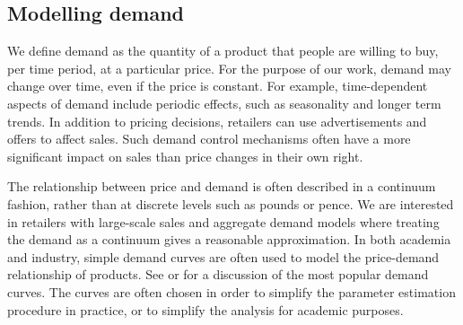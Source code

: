 \documentclass[main.tex]{subfiles}
\begin{document}
\subsection{Modelling demand}\label{sec:intro_model_demand}
We define demand as the quantity of a product that people are willing
to buy, per time period, at a particular price. For the purpose of our
work, demand may change over time, even if the price is constant.
For example, time-dependent aspects of demand include periodic effects, such as
seasonality and longer term trends.
In addition to pricing decisions, retailers can use advertisements and
offers to affect sales. Such demand control mechanisms often have a
more significant impact on sales than price changes in their own
right. %

The relationship between price and demand is often described in a
continuum fashion, rather than at discrete levels such as pounds or
pence. We are interested in retailers with large-scale sales and
aggregate demand models where treating the demand as a continuum gives
a reasonable approximation.
In both academia and industry, simple demand curves are often used to
model the price-demand relationship of
products. See \citet[Ch.~7.3]{talluri2006theory} or \citet{phillips2005pricing}
for a discussion of the most popular demand curves. The curves are often
chosen in order to simplify the parameter
estimation procedure in practice, or to simplify the analysis for academic purposes.
\end{document}
